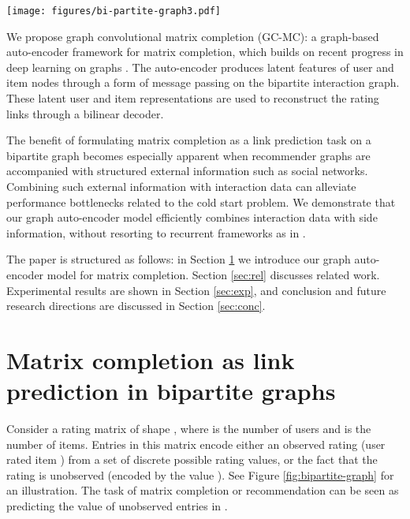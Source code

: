 \documentclass[twoside]{article}
\begin{document}
\begin{figure*}[htp!]
    \centering
    \texttt{[image: figures/bi-partite-graph3.pdf]}
    \caption{\textit{Left}: Rating matrix  with entries that correspond to user-item interactions (ratings between 1-5) or missing observations (0). \textit{Right}: User-item interaction graph with bipartite structure. Edges correspond to interaction events, numbers on edges denote the rating a user has given to a particular item. The matrix completion task (i.e.~predictions for unobserved interactions) can be cast as a link prediction problem and modeled using an end-to-end trainable graph auto-encoder.}
    \label{fig:bipartite-graph}
\end{figure*}

We propose graph convolutional matrix completion (GC-MC): a graph-based auto-encoder framework for matrix completion, which builds on recent progress in deep learning on graphs \cite{bruna2013spectral, duvenaud2015convolutional, li2015gated, defferrard2016convolutional, kipf2016semi, tian2014learning, kipf2016variational}.
The auto-encoder produces latent features of user and item nodes through a form of message passing on the bipartite interaction graph. These latent user and item representations are used to reconstruct the rating links through a bilinear decoder. 

The benefit of formulating matrix completion as a link prediction task on a bipartite graph becomes especially apparent when recommender graphs are accompanied with structured external information such as social networks. Combining such external information with interaction data can alleviate performance bottlenecks related to the cold start problem. We demonstrate that our graph auto-encoder model efficiently combines interaction data with side information, without resorting to recurrent frameworks as in \cite{2017_Monti_arXiv}.

The paper is structured as follows: in Section \ref{section:mc_link_prediction} we introduce our graph auto-encoder model for matrix completion. Section \ref{sec:rel} discusses related work. Experimental results are shown in Section \ref{sec:exp}, and conclusion and future research directions are discussed in Section \ref{sec:conc}. 
\section{Matrix completion as link prediction in bipartite graphs} 
\label{section:mc_link_prediction}
Consider a rating matrix  of shape , where  is the number of users and  is the number of items. Entries  in this matrix encode either an observed rating (user  rated item ) from a set of discrete possible rating values, or the fact that the rating is unobserved (encoded by the value ). See Figure \ref{fig:bipartite-graph} for an illustration. The task of matrix completion or recommendation can be seen as predicting the value of unobserved entries in .
\end{document}
